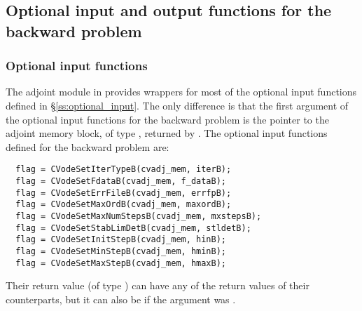 \subsection{Optional input and output functions for the backward problem}
\label{ss:optional_io_B}

\subsubsection{Optional input functions}
The adjoint module in {\cvodes} provides wrappers for most of the optional 
input functions defined in \S\ref{ss:optional_input}. The only difference is 
that the first argument of the optional input functions for the backward problem
is the pointer to the adjoint memory block,  of type ,
returned by . 
The optional input functions defined for the backward problem are:
\begin{verbatim}
  flag = CVodeSetIterTypeB(cvadj_mem, iterB);
  flag = CVodeSetFdataB(cvadj_mem, f_dataB);
  flag = CVodeSetErrFileB(cvadj_mem, errfpB);
  flag = CVodeSetMaxOrdB(cvadj_mem, maxordB);
  flag = CVodeSetMaxNumStepsB(cvadj_mem, mxstepsB);
  flag = CVodeSetStabLimDetB(cvadj_mem, stldetB);
  flag = CVodeSetInitStepB(cvadj_mem, hinB);
  flag = CVodeSetMinStepB(cvadj_mem, hminB);
  flag = CVodeSetMaxStepB(cvadj_mem, hmaxB);
\end{verbatim}
Their return value  (of type ) can have any of the return values 
of their counterparts, but it can also be  if the  
argument was .

